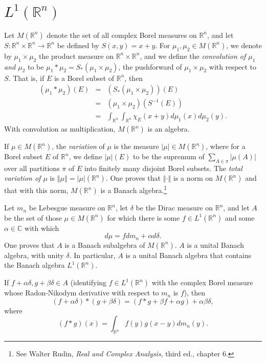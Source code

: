 \documentclass{article}
\newcommand{\norm}[1]{\left\Vert #1 \right\Vert}
\theoremstyle{definition}
\begin{document}
\section{$L^1(\mathbb{R}^n)$}
\label{convolvesection}
Let $M(\mathbb{R}^n)$ denote the set of all complex Borel measures on $\mathbb{R}^n$, 
and let $S:\mathbb{R}^n \times \mathbb{R}^n \to \mathbb{R}^n$ be defined by $S(x,y)=x+y$.
For $\mu_1, \mu_2 \in M(\mathbb{R}^n)$, we denote by $\mu_1 \times \mu_2$ the product measure on
$\mathbb{R}^n \times \mathbb{R}^n$, and we define
the {\em convolution of $\mu_1$ and $\mu_2$} to be $\mu_1 * \mu_2 = S_*(\mu_1 \times \mu_2)$, the pushforward of
$\mu_1 \times \mu_2$ with respect to $S$. That is,
if $E$ is a Borel subset of $\mathbb{R}^n$, then
\begin{eqnarray*}
(\mu_1 * \mu_2)(E) &=& (S_*(\mu_1 \times \mu_2))(E)\\
&=& (\mu_1 \times \mu_2)(S^{-1}(E))\\
& =& \int_{\mathbb{R}^n} \int_{\mathbb{R}^n} \chi_E(x+y) d\mu_1(x) d\mu_2(y).
\end{eqnarray*}
With convolution as multiplication, $M(\mathbb{R}^n)$ is an algebra.

If $\mu \in M(\mathbb{R}^n)$, the {\em variation} of $\mu$ is the measure $|\mu| \in M(\mathbb{R}^n)$, where for a Borel subset $E$ of $\mathbb{R}^n$,
we define $|\mu|(E)$ to be the supremum of $\sum_{A \in \pi} |\mu(A)|$ over all partitions $\pi$ of $E$ into finitely many disjoint Borel subsets.
The {\em total variation of $\mu$} is $\norm{\mu}=|\mu|(\mathbb{R}^n)$. One proves that $\norm{\cdot}$ is a norm on $M(\mathbb{R}^n)$ and that
with this norm, $M(\mathbb{R}^n)$ is a Banach algebra.\footnote{See
Walter Rudin, {\em Real and Complex Analysis}, third ed., chapter 6.}
 

Let $m_n$ be Lebesgue measure on $\mathbb{R}^n$,  let $\delta$ be the Dirac  measure on $\mathbb{R}^n$,
and let $A$ be the set of those $\mu \in M(\mathbb{R}^n)$ for which there is some $f \in L^1(\mathbb{R}^n)$ and some $\alpha \in \mathbb{C}$
with which
\[
d\mu = fdm_n + \alpha d\delta.
\]
One proves that $A$ is a Banach subalgebra of $M(\mathbb{R}^n)$. $A$ is a unital Banach algebra, with unity $\delta$.
In particular, $A$ is a unital Banach algebra that contains
the Banach algebra $L^1(\mathbb{R}^n)$.

If $f+\alpha \delta, g+\beta \delta \in A$ (identifying $f \in L^1(\mathbb{R}^n)$ with the complex Borel measure whose
Radon-Nikodym derivative with respect to $m_n$ is $f$), then
\begin{equation}
(f+\alpha \delta)*(g+\beta \delta) = (f*g+\beta f + \alpha g) + \alpha \beta \delta,
\label{convolveproduct}
\end{equation}
where 
\[
(f*g)(x) = \int_{\mathbb{R}^n} f(y)g(x-y) dm_n(y).
\]
\end{document}
